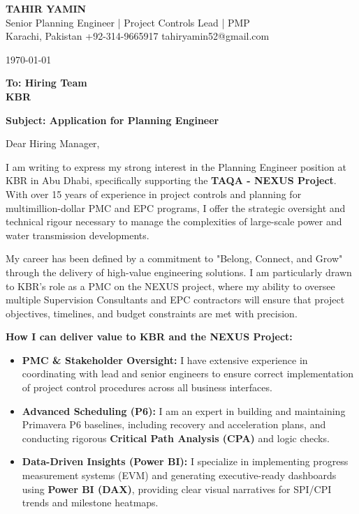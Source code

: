 \documentclass[11pt,a4paper]{article}
\begin{document}
\begin{center}
    {\Huge \textbf{\color{awesome-darknight} TAHIR YAMIN}} \\[0.2cm]
    {\Large \color{awesome-gray} Senior Planning Engineer | Project Controls Lead | PMP} \\[0.3cm]
    
    \small \color{light-gray}
    Karachi, Pakistan \quad \textbullet \quad 
    +92-314-9665917 \quad \textbullet \quad 
    tahiryamin52@gmail.com
\end{center}

\vspace{0.8cm}
\today
\vspace{0.5cm}

\textbf{To: Hiring Team} \\
\textbf{KBR} \\
\vspace{0.5cm}

\textbf{Subject: Application for Planning Engineer}

\vspace{0.5cm}

Dear Hiring Manager,

I am writing to express my strong interest in the Planning Engineer position at KBR in Abu Dhabi, specifically supporting the \textbf{TAQA - NEXUS Project}. With over 15 years of experience in project controls and planning for multimillion-dollar PMC and EPC programs, I offer the strategic oversight and technical rigour necessary to manage the complexities of large-scale power and water transmission developments.

My career has been defined by a commitment to "Belong, Connect, and Grow" through the delivery of high-value engineering solutions. I am particularly drawn to KBR's role as a PMC on the NEXUS project, where my ability to oversee multiple Supervision Consultants and EPC contractors will ensure that project objectives, timelines, and budget constraints are met with precision.

\textbf{How I can deliver value to KBR and the NEXUS Project:}
\begin{itemize}
    \item \textbf{PMC & Stakeholder Oversight:} I have extensive experience in coordinating with lead and senior engineers to ensure correct implementation of project control procedures across all business interfaces.
    \item \textbf{Advanced Scheduling (P6):} I am an expert in building and maintaining Primavera P6 baselines, including recovery and acceleration plans, and conducting rigorous \textbf{Critical Path Analysis (CPA)} and logic checks.
    \item \textbf{Data-Driven Insights (Power BI):} I specialize in implementing progress measurement systems (EVM) and generating executive-ready dashboards using \textbf{Power BI (DAX)}, providing clear visual narratives for SPI/CPI trends and milestone heatmaps.
\end{itemize}
\end{document}
